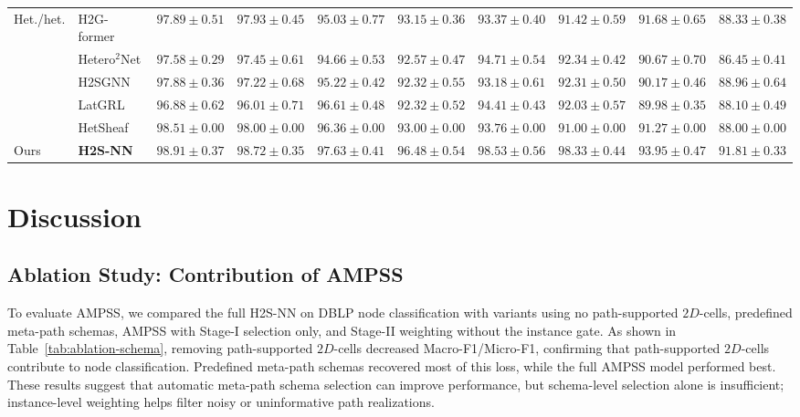 \documentclass[sigconf,anonymous,review]{acmart}
\newcommand{\method}{\textsc{H2S-NN}}
\newcommand{\ampss}{\textsc{AMPSS}}
\begin{document}
\begin{table}[htbp]
{\begin{tabular}{llcccccccc}
    \multirow{5}{*}{Het./het.}
    & H2G-former
    & $97.89 \pm 0.51$ & $97.93 \pm 0.45$
    & $95.03 \pm 0.77$ & $93.15 \pm 0.36$
    & $93.37 \pm 0.40$ & $91.42 \pm 0.59$
    & $91.68 \pm 0.65$ & $88.33 \pm 0.38$ \\
    & Hetero$^2$Net
    & $97.58 \pm 0.29$ & $97.45 \pm 0.61$
    & $94.66 \pm 0.53$ & $92.57 \pm 0.47$
    & $94.71 \pm 0.54$ & $92.34 \pm 0.42$
    & $90.67 \pm 0.70$ & $86.45 \pm 0.41$ \\
    & H2SGNN
    & $97.88 \pm 0.36$ & $97.22 \pm 0.68$
    & $95.22 \pm 0.42$ & $92.32 \pm 0.55$
    & $93.18 \pm 0.61$ & $92.31 \pm 0.50$
    & $90.17 \pm 0.46$ & $88.96 \pm 0.64$ \\
    & LatGRL
    & $96.88 \pm 0.62$ & $96.01 \pm 0.71$
    & $96.61 \pm 0.48$ & $92.32 \pm 0.52$
    & $94.41 \pm 0.43$ & $92.03 \pm 0.57$
    & $89.98 \pm 0.35$ & $88.10 \pm 0.49$ \\
    & HetSheaf
    & $98.51 \pm 0.00$ & $98.00 \pm 0.00$
    & $96.36 \pm 0.00$ & $93.00 \pm 0.00$
    & $93.76 \pm 0.00$ & $91.00 \pm 0.00$
    & $91.27 \pm 0.00$ & $88.00 \pm 0.00$ \\
    \midrule

    Ours
    & \textbf{\method{}}
    & $\mathbf{98.91 \pm 0.37}$ & $\mathbf{98.72 \pm 0.35}$
    & $\mathbf{97.63 \pm 0.41}$ & $\mathbf{96.48 \pm 0.54}$ 
    & $\mathbf{98.53 \pm 0.56}$ & $\mathbf{98.33 \pm 0.44}$
    & $\mathbf{93.95 \pm 0.47}$ & $\mathbf{91.81 \pm 0.33}$  \\
    \bottomrule
  \end{tabular}%
  }
\end{table}

\section{Discussion}
\label{sec:analysis-results}

\subsection{Ablation Study: Contribution of {\ampss{}}}

To evaluate \ampss{}, we compared the full \method{} on DBLP node classification with variants using no path-supported \(2D\)-cells, predefined meta-path schemas, \ampss{} with Stage-I selection only, and Stage-II weighting without the instance gate. As shown in Table~\ref{tab:ablation-schema}, removing path-supported \(2D\)-cells decreased Macro-F1/Micro-F1, confirming that path-supported \(2D\)-cells contribute to node classification. Predefined meta-path schemas recovered most of this loss, while the full \ampss{} model performed best. These results suggest that automatic meta-path schema selection can improve performance, but schema-level selection alone is insufficient; instance-level weighting helps filter noisy or uninformative path realizations.
\end{document}
